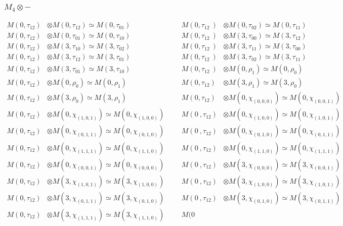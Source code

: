 \subsubsection{$M_4\otimes -$}
\begin{align*}
M(0,\tau_{12}) &\otimes M(0,\tau_{12}) \simeq M(0,\tau_{01}) &&& M(0,\tau_{12}\
) &\otimes M(0,\tau_{02}) \simeq M(0,\tau_{11})\\
M(0,\tau_{12}) &\otimes M(0,\tau_{01}) \simeq M(0,\tau_{10}) &&& M(0,\tau_{12}\
) &\otimes M(3,\tau_{00}) \simeq M(3,\tau_{12})\\
M(0,\tau_{12}) &\otimes M(3,\tau_{10}) \simeq M(3,\tau_{02}) &&& M(0,\tau_{12}\
) &\otimes M(3,\tau_{11}) \simeq M(3,\tau_{00})\\
M(0,\tau_{12}) &\otimes M(3,\tau_{12}) \simeq M(3,\tau_{01}) &&& M(0,\tau_{12}\
) &\otimes M(3,\tau_{02}) \simeq M(3,\tau_{11})\\
M(0,\tau_{12}) &\otimes M(3,\tau_{01}) \simeq M(3,\tau_{10}) &&& M(0,\tau_{12}\
) &\otimes M(0,\rho_{1}) \simeq M(0,\rho_{0})\\
M(0,\tau_{12}) &\otimes M(0,\rho_{0}) \simeq M(0,\rho_{1}) &&& M(0,\tau_{12}) \
&\otimes M(3,\rho_{1}) \simeq M(3,\rho_{0})\\
M(0,\tau_{12}) &\otimes M(3,\rho_{0}) \simeq M(3,\rho_{1}) &&& M(0,\tau_{12}) \
&\otimes M(0,\chi_{(0,0,0)}) \simeq M(0,\chi_{(0,0,1)})\\
M(0,\tau_{12}) &\otimes M(0,\chi_{(1,0,1)}) \simeq M(0,\chi_{(1,0,0)}) &&& M(0\
,\tau_{12}) &\otimes M(0,\chi_{(1,0,0)}) \simeq M(0,\chi_{(1,0,1)})\\
M(0,\tau_{12}) &\otimes M(0,\chi_{(0,1,1)}) \simeq M(0,\chi_{(0,1,0)}) &&& M(0\
,\tau_{12}) &\otimes M(0,\chi_{(0,1,0)}) \simeq M(0,\chi_{(0,1,1)})\\
M(0,\tau_{12}) &\otimes M(0,\chi_{(1,1,1)}) \simeq M(0,\chi_{(1,1,0)}) &&& M(0\
,\tau_{12}) &\otimes M(0,\chi_{(1,1,0)}) \simeq M(0,\chi_{(1,1,1)})\\
M(0,\tau_{12}) &\otimes M(0,\chi_{(0,0,1)}) \simeq M(0,\chi_{(0,0,0)}) &&& M(0\
,\tau_{12}) &\otimes M(3,\chi_{(0,0,0)}) \simeq M(3,\chi_{(0,0,1)})\\
M(0,\tau_{12}) &\otimes M(3,\chi_{(1,0,1)}) \simeq M(3,\chi_{(1,0,0)}) &&& M(0\
,\tau_{12}) &\otimes M(3,\chi_{(1,0,0)}) \simeq M(3,\chi_{(1,0,1)})\\
M(0,\tau_{12}) &\otimes M(3,\chi_{(0,1,1)}) \simeq M(3,\chi_{(0,1,0)}) &&& M(0\
,\tau_{12}) &\otimes M(3,\chi_{(0,1,0)}) \simeq M(3,\chi_{(0,1,1)})\\
M(0,\tau_{12}) &\otimes M(3,\chi_{(1,1,1)}) \simeq M(3,\chi_{(1,1,0)}) &&& M(0\

\end{align*}
